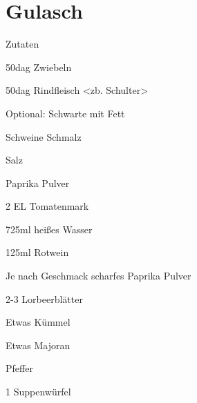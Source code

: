\chapter*{Gulasch}
\begin{multicols}{2}
 {\Large Zutaten}
 \begin{Zutaten}
		\item 50dag Zwiebeln
		\item 50dag Rindfleisch <zb. Schulter>
		\item Optional: Schwarte mit Fett
		\item Schweine Schmalz
		\item Salz
		\item Paprika Pulver
		\item 2 EL Tomatenmark
		\item 725ml heißes Wasser
		\item 125ml Rotwein
		\item Je nach Geschmack scharfes Paprika Pulver
		\item 2-3 Lorbeerblätter
		\item Etwas Kümmel
		\item Etwas Majoran
		\item Pfeffer
		\item 1 Suppenwürfel
		
		
		
\end{Zutaten}
	
\columnbreak
{}
\end{multicols}

